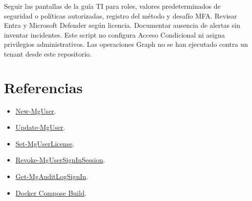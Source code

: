 \documentclass[12pt,a4paper]{article}
\begin{document}
Seguir las pantallas de la guía TI para roles, valores predeterminados de seguridad o políticas autorizadas, registro del método y desafío MFA. Revisar Entra y Microsoft Defender según licencia. Documentar ausencia de alertas sin inventar incidentes. Este script no configura Acceso Condicional ni asigna privilegios administrativos. Las operaciones Graph no se han ejecutado contra un tenant desde este repositorio.\par
{}\section*{Referencias}
\begin{itemize}
\item \href{https://learn.microsoft.com/en-us/powershell/module/microsoft.graph.users/new-mguser?view=graph-powershell-1.0}{New-MgUser}.
\item \href{https://learn.microsoft.com/en-us/powershell/module/microsoft.graph.users/update-mguser}{Update-MgUser}.
\item \href{https://learn.microsoft.com/en-us/powershell/module/microsoft.graph.users.actions/set-mguserlicense}{Set-MgUserLicense}.
\item \href{https://learn.microsoft.com/en-us/powershell/module/microsoft.graph.users.actions/revoke-mgusersigninsession}{Revoke-MgUserSignInSession}.
\item \href{https://learn.microsoft.com/en-us/powershell/module/microsoft.graph.reports/get-mgauditlogsignin}{Get-MgAuditLogSignIn}.
\item \href{https://docs.docker.com/reference/compose-file/build/}{Docker Compose Build}.
\end{itemize}
\end{document}
